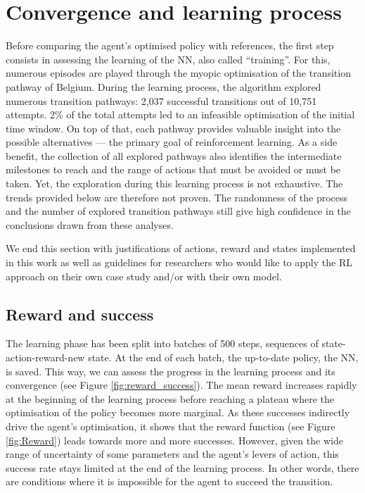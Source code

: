 \section{Convergence and learning process}
\label{sec:RL:learning}

Before comparing the agent's optimised policy with references, the first step consists in assessing the learning of the \gls{NN}, also called ``training''. For this, numerous episodes are played through the myopic optimisation of the transition pathway of Belgium. During the learning process, the algorithm explored numerous transition pathways: 2,037 successful transitions out of 10,751 attempts. 2\% of the total attempts led to an infeasible optimisation of the initial time window. On top of that, each pathway provides valuable insight into the possible alternatives --- the primary goal of reinforcement learning. As a side benefit, the collection of all explored pathways also identifies the intermediate milestones to reach and the range of actions that must be avoided or must be taken. Yet, the exploration during this learning process is not exhaustive. The trends provided below are therefore not proven. The randomness of the process and the number of explored transition pathways still give high confidence in the conclusions drawn from these analyses.

We end this section with justifications of actions, reward and states implemented in this work as well as guidelines for researchers who would like to apply the RL approach on their own case study and/or with their own model.

\subsection{Reward and success}
\label{subsec:RL:learning:rew_succ}

The learning phase has been split into batches of 500 steps,  sequences of state-action-reward-new state. %
At the end of each batch, the up-to-date policy, \ie the \gls{NN}, is saved. This way, we can assess the progress in the learning process and its convergence (see Figure \ref{fig:reward_success}).  The mean reward increases rapidly at the beginning of the learning process before reaching a plateau where the optimisation of the policy becomes more marginal.  As these successes indirectly drive the agent's optimisation, it shows that the reward function (see Figure \ref{fig:Reward}) leads towards more and more successes. However, given the wide range of uncertainty of some parameters and the agent's levers of action, this success rate stays limited at the end of the learning process. In other words, there are conditions where it is impossible for the agent to succeed the transition.

